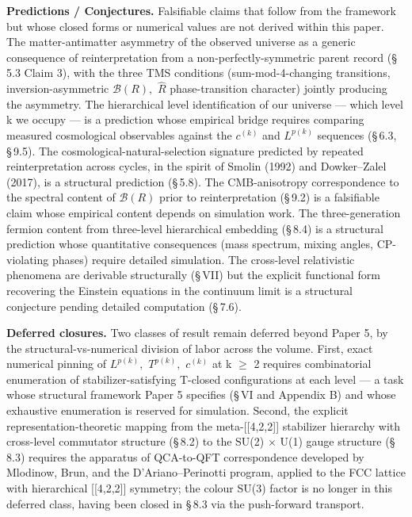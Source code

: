 \documentclass[11pt,oneside]{report}
\theoremstyle{definition}
\theoremstyle{remark}
\begin{document}
\textbf{Predictions / Conjectures.} Falsifiable claims that follow from
the framework but whose closed forms or numerical values are not derived
within this paper. The matter-antimatter asymmetry of the observed
universe as a generic consequence of reinterpretation from a
non-perfectly-symmetric parent record (\S\,5.3 Claim 3), with the three TMS
conditions (sum-mod-4-changing transitions, inversion-asymmetric \ensuremath{\mathcal{B}(R),} \ensuremath{\hat{R}}
phase-transition character) jointly producing the asymmetry. The
hierarchical level identification of our universe --- which level k we
occupy --- is a prediction whose empirical bridge requires comparing
measured cosmological observables against the \ensuremath{c^{(k)}} and \ensuremath{L^{p(k)}} sequences
(\S\,6.3, \S\,9.5). The cosmological-natural-selection signature predicted by
repeated reinterpretation across cycles, in the spirit of Smolin (1992)
and Dowker--Zalel (2017), is a structural prediction (\S\,5.8). The
CMB-anisotropy correspondence to the spectral content of \ensuremath{\mathcal{B}(R)} prior to
reinterpretation (\S\,9.2) is a falsifiable claim whose empirical content
depends on simulation work. The three-generation fermion content from
three-level hierarchical embedding (\S\,8.4) is a structural prediction
whose quantitative consequences (mass spectrum, mixing angles,
CP-violating phases) require detailed simulation. The cross-level
relativistic phenomena are derivable structurally (\S\,VII) but the
explicit functional form recovering the Einstein equations in the
continuum limit is a structural conjecture pending detailed computation
(\S\,7.6).

\textbf{Deferred closures.} Two classes of result remain deferred beyond
Paper 5, by the structural-vs-numerical division of labor across the
volume. First, exact numerical pinning of \ensuremath{L^{p(k)},} \ensuremath{T^{p(k)},} \ensuremath{c^{(k)}} at k \ensuremath{\geq}
2 requires combinatorial enumeration of stabilizer-satisfying T-closed
configurations at each level --- a task whose structural framework Paper
5 specifies (\S\,VI and Appendix B) and whose exhaustive enumeration is
reserved for simulation. Second, the explicit representation-theoretic
mapping from the meta-[[4,2,2]] stabilizer hierarchy with
cross-level commutator structure (\S\,8.2) to the SU(2) \ensuremath{\times} U(1) gauge
structure (\S\,8.3) requires the apparatus of QCA-to-QFT correspondence
developed by Mlodinow, Brun, and the D'Ariano--Perinotti program,
applied to the FCC lattice with hierarchical [[4,2,2]] symmetry;
the colour SU(3) factor is no longer in this deferred class, having been
closed in \S\,8.3 via the push-forward transport.
\end{document}
